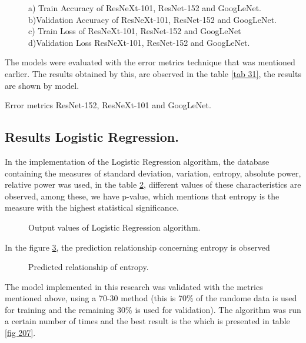 \documentclass[letterpaper,12pt,openright,oneside]{article}
\begin{document}
\begin{figure}[H]
\centerline{}
\caption{a) Train Accuracy of ResNeXt-101, ResNet-152 and GoogLeNet. b)Validation Accuracy of ResNeXt-101, ResNet-152 and GoogLeNet. c) Train Loss of  ResNeXt-101, ResNet-152 and GoogLeNet d)Validation Loss ResNeXt-101, ResNet-152 and GoogLeNet. }
\label{fig 109}
\end{figure}


The models were evaluated with the error metrics technique that was mentioned earlier. The results obtained by this, are observed in the table \ref{tab 31}, the results are shown by model.

\begin{table}[H]
\centerline{}
\caption{Error metrics ResNet-152, ResNeXt-101 and GoogLeNet.}
\label{tab 31}
\end{table}




\subsection{Results Logistic Regression.}


In the implementation of the Logistic Regression algorithm, the database containing the measures of standard deviation, variation, entropy, absolute power, relative power was used, in the table \ref{fig 205}, different values of these characteristics are observed, among these, we have p-value, which mentions that entropy is the measure with the highest statistical significance.\\

\begin{figure}[H]
\centerline{}
\caption{Output values of Logistic Regression algorithm.}
\label{fig 205}
\end{figure}

In the figure \ref{fig 200}, the prediction relationship concerning entropy is observed

\begin{figure}[H]
\centerline{}
\caption{Predicted relationship of entropy.}
\label{fig 200}
\end{figure}

The model implemented in this research was validated with the metrics mentioned above, using a 70-30 method (this is  70\% of the randome data is used for training and the remaining 30\% is used for validation). The algorithm was run a certain number of times and the best result is the which is presented in table \ref{fig 207}.
\end{document}
